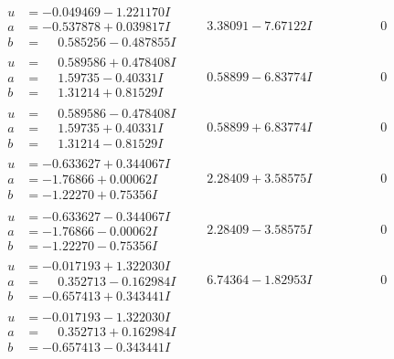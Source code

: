 \documentclass[1p]{elsarticle_modified}
\theoremstyle{definition}
\begin{document}
$$\begin{array}{c|c|c}
\begin{aligned}
u &= -0.049469 - 1.221170 I \\
a &= -0.537878 + 0.039817 I \\
b &= \phantom{-}0.585256 - 0.487855 I\end{aligned}
 & \phantom{-}3.38091 - 7.67122 I & \phantom{-0.000000 } 0 \\ \hline\begin{aligned}
u &= \phantom{-}0.589586 + 0.478408 I \\
a &= \phantom{-}1.59735 - 0.40331 I \\
b &= \phantom{-}1.31214 + 0.81529 I\end{aligned}
 & \phantom{-}0.58899 - 6.83774 I & \phantom{-0.000000 } 0 \\ \hline\begin{aligned}
u &= \phantom{-}0.589586 - 0.478408 I \\
a &= \phantom{-}1.59735 + 0.40331 I \\
b &= \phantom{-}1.31214 - 0.81529 I\end{aligned}
 & \phantom{-}0.58899 + 6.83774 I & \phantom{-0.000000 } 0 \\ \hline\begin{aligned}
u &= -0.633627 + 0.344067 I \\
a &= -1.76866 + 0.00062 I \\
b &= -1.22270 + 0.75356 I\end{aligned}
 & \phantom{-}2.28409 + 3.58575 I & \phantom{-0.000000 } 0 \\ \hline\begin{aligned}
u &= -0.633627 - 0.344067 I \\
a &= -1.76866 - 0.00062 I \\
b &= -1.22270 - 0.75356 I\end{aligned}
 & \phantom{-}2.28409 - 3.58575 I & \phantom{-0.000000 } 0 \\ \hline\begin{aligned}
u &= -0.017193 + 1.322030 I \\
a &= \phantom{-}0.352713 - 0.162984 I \\
b &= -0.657413 + 0.343441 I\end{aligned}
 & \phantom{-}6.74364 - 1.82953 I & \phantom{-0.000000 } 0 \\ \hline\begin{aligned}
u &= -0.017193 - 1.322030 I \\
a &= \phantom{-}0.352713 + 0.162984 I \\
b &= -0.657413 - 0.343441 I\end{aligned}

\end{array}$$
\end{document}
